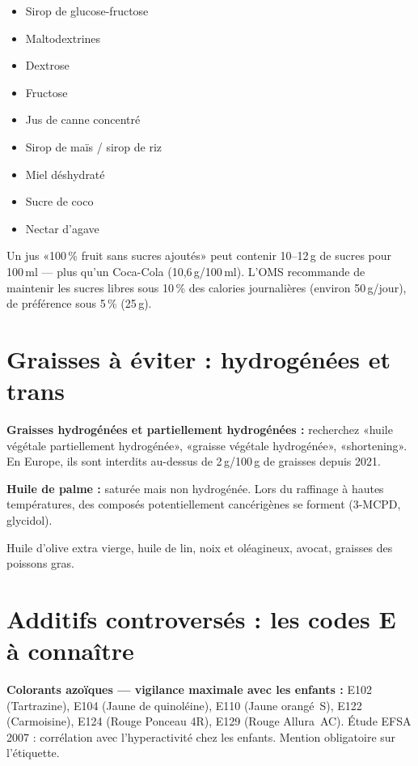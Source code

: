 \documentclass[a5paper,12pt,oneside,openany]{book}
\newcommand{\boxvert}[2]{%
  \begin{tcolorbox}[boitebase,
    colback=verdescuro!8!white, colframe=verdescuro, title={#1}]
  #2\end{tcolorbox}}
\newcommand{\boxjaune}[2]{%
  \begin{tcolorbox}[boitebase,
    colback=jaune!12!white, colframe=jaune!80!black, title={#1}]
  #2\end{tcolorbox}}
\begin{document}
\begin{itemize}
  \item Sirop de glucose-fructose
  \item Maltodextrines
  \item Dextrose
  \item Fructose
  \item Jus de canne concentré
  \item Sirop de maïs / sirop de riz
  \item Miel déshydraté
  \item Sucre de coco
  \item Nectar d'agave
\end{itemize}

\boxjaune{Le piège du «sans sucres ajoutés»}{Un jus «100\,\% fruit sans sucres
ajoutés» peut contenir 10--12\,g de sucres pour 100\,ml --- plus qu'un Coca-Cola
(10,6\,g/100\,ml). L'OMS recommande de maintenir les sucres libres sous 10\,\%
des calories journalières (environ 50\,g/jour), de préférence sous 5\,\% (25\,g).}

\section{Graisses à éviter : hydrogénées et trans}

\textbf{Graisses hydrogénées et partiellement hydrogénées :} recherchez «huile
végétale partiellement hydrogénée», «graisse végétale hydrogénée», «shortening».
En Europe, ils sont interdits au-dessus de 2\,g/100\,g de graisses depuis 2021.

\textbf{Huile de palme :} saturée mais non hydrogénée. Lors du raffinage à
hautes températures, des composés potentiellement cancérigènes se forment
(3-MCPD, glycidol).

\boxvert{Les graisses qui conviennent}{Huile d'olive extra vierge, huile de lin,
noix et oléagineux, avocat, graisses des poissons gras.}

\section{Additifs controversés : les codes E à connaître}

\textbf{Colorants azoïques --- vigilance maximale avec les enfants :}
E102 (Tartrazine), E104 (Jaune de quinoléine), E110 (Jaune orangé~S),
E122 (Carmoisine), E124 (Rouge Ponceau 4R), E129 (Rouge Allura~AC).
Étude EFSA 2007 : corrélation avec l'hyperactivité chez les enfants. Mention
obligatoire sur l'étiquette.
\end{document}
